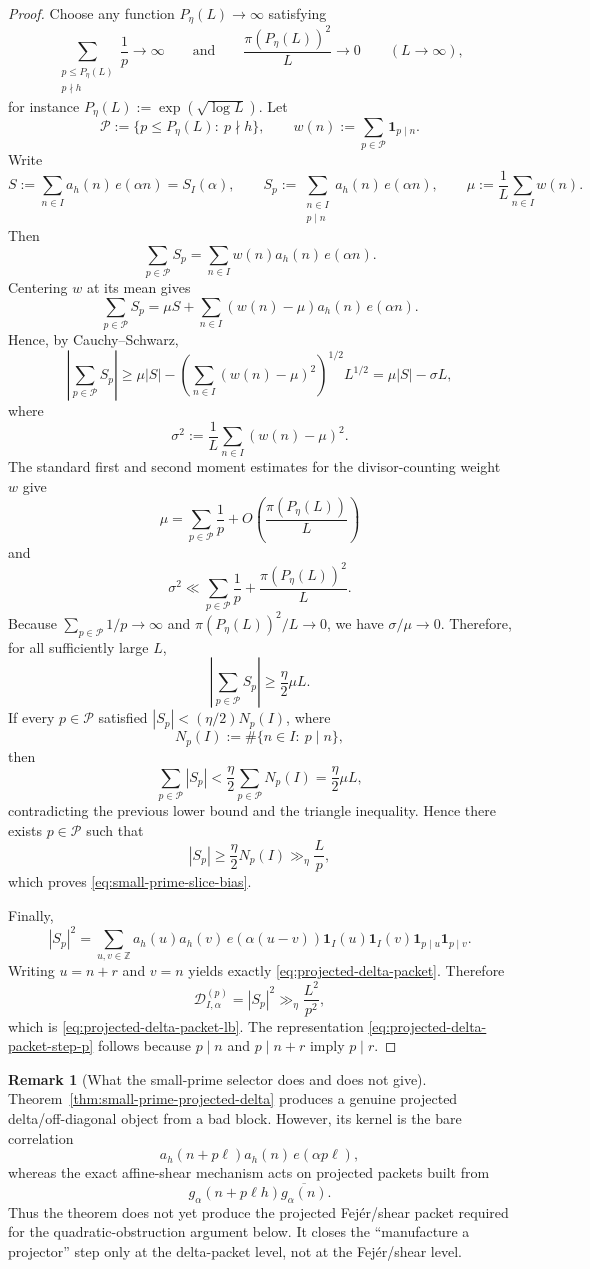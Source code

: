 \documentclass[11pt]{scrartcl}
\numberwithin{equation}{section}
\theoremstyle{definition}
\newtheorem{remark}[theorem]{Remark}
\newcommand{\Z}{\mathbb Z}
\newcommand{\1}{\mathbf 1}
\newcommand{\ee}[1]{e\!\left(#1\right)}
\begin{document}
\begin{proof}
Choose any function $P_\eta(L)\to\infty$ satisfying
\[
\sum_{\substack{p\le P_\eta(L)\\ p\nmid h}}\frac1p\to\infty
\qquad\text{and}\qquad
\frac{\pi(P_\eta(L))^2}{L}\to 0
\qquad (L\to\infty),
\]
for instance $P_\eta(L):=\exp(\sqrt{\log L})$. Let
\[
\mathcal P:=\{p\le P_\eta(L):\ p\nmid h\},
\qquad
w(n):=\sum_{p\in\mathcal P}\mathbf 1_{p\mid n}.
\]
Write
\[
S:=\sum_{n\in I} a_h(n)\,\ee{\alpha n}=S_I(\alpha),
\qquad
S_p:=\sum_{\substack{n\in I\\ p\mid n}} a_h(n)\,\ee{\alpha n},
\qquad
\mu:=\frac1L\sum_{n\in I}w(n).
\]
Then
\[
\sum_{p\in\mathcal P}S_p=\sum_{n\in I} w(n)a_h(n)\,\ee{\alpha n}.
\]
Centering $w$ at its mean gives
\[
\sum_{p\in\mathcal P}S_p
=
\mu S+
\sum_{n\in I}(w(n)-\mu)a_h(n)\,\ee{\alpha n}.
\]
Hence, by Cauchy--Schwarz,
\[
\left|\sum_{p\in\mathcal P}S_p\right|
\ge
\mu|S|-
\left(\sum_{n\in I}(w(n)-\mu)^2\right)^{1/2}L^{1/2}
=
\mu|S|-\sigma L,
\]
where
\[
\sigma^2:=\frac1L\sum_{n\in I}(w(n)-\mu)^2.
\]
The standard first and second moment estimates for the divisor-counting weight $w$ give
\[
\mu=
\sum_{p\in\mathcal P}\frac1p+O\!\left(\frac{\pi(P_\eta(L))}{L}\right)
\]
and
\[
\sigma^2\ll
\sum_{p\in\mathcal P}\frac1p
+
\frac{\pi(P_\eta(L))^2}{L}.
\]
Because $\sum_{p\in\mathcal P}1/p\to\infty$ and $\pi(P_\eta(L))^2/L\to 0$, we have $\sigma/\mu\to 0$. Therefore, for all sufficiently large $L$,
\[
\left|\sum_{p\in\mathcal P}S_p\right|\ge \frac{\eta}{2}\mu L.
\]
If every $p\in\mathcal P$ satisfied $|S_p|<(\eta/2)N_p(I)$, where
\[
N_p(I):=\#\{n\in I:\ p\mid n\},
\]
then
\[
\sum_{p\in\mathcal P}|S_p|<\frac{\eta}{2}\sum_{p\in\mathcal P}N_p(I)=\frac{\eta}{2}\mu L,
\]
contradicting the previous lower bound and the triangle inequality. Hence there exists $p\in\mathcal P$ such that
\[
|S_p|\ge \frac{\eta}{2}N_p(I)\gg_\eta \frac{L}{p},
\]
which proves \eqref{eq:small-prime-slice-bias}.

Finally,
\[
|S_p|^2
=
\sum_{u,v\in\Z}
a_h(u)a_h(v)\,\ee{\alpha(u-v)}
\mathbf 1_I(u)\mathbf 1_I(v)
\mathbf 1_{p\mid u}\mathbf 1_{p\mid v}.
\]
Writing $u=n+r$ and $v=n$ yields exactly \eqref{eq:projected-delta-packet}. Therefore
\[
\mathcal D^{(p)}_{I,\alpha}=|S_p|^2\gg_\eta \frac{L^2}{p^2},
\]
which is \eqref{eq:projected-delta-packet-lb}. The representation \eqref{eq:projected-delta-packet-step-p} follows because $p\mid n$ and $p\mid n+r$ imply $p\mid r$.
\end{proof}

\begin{remark}[What the small-prime selector does and does not give]
Theorem~\ref{thm:small-prime-projected-delta} produces a genuine projected delta/off-diagonal object from a bad block. However, its kernel is the bare correlation
\[
a_h(n+p\ell)a_h(n)\,\ee{\alpha p\ell},
\]
whereas the exact affine-shear mechanism acts on projected packets built from
\[
g_\alpha(n+p\ell h)\overline{g_\alpha(n)}.
\]
Thus the theorem does not yet produce the projected Fej\'er/shear packet required for the quadratic-obstruction argument below. It closes the ``manufacture a projector'' step only at the delta-packet level, not at the Fej\'er/shear level.
\end{remark}
\end{document}
